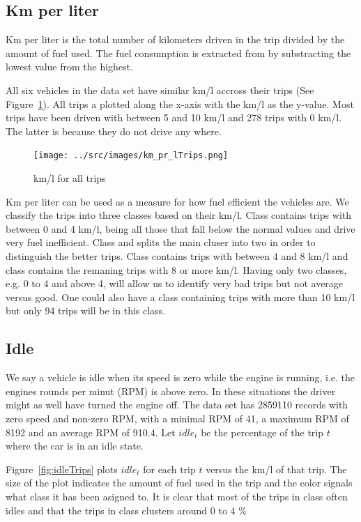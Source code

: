 \subsection{Km per liter}
Km per liter is the total number of kilometers driven in the trip divided by the amount of fuel used.
The fuel consumption is extracted from  by substracting the lowest value from the highest.

All six vehicles in the data set have similar km/l accross their trips (See Figure~\ref{fig:kmlTrips}).
All trips a plotted along the x-axis with the km/l as the y-value.
Most trips have been driven with between 5 and 10 km/l and 278 trips with 0 km/l. %
The latter is because they do not drive any where.
\begin{figure}[htb]
\centering
\texttt{[image: ../src/images/km\_pr\_lTrips.png]}
\caption{km/l for all trips}
\label{fig:kmlTrips}
\end{figure}

Km per liter can be used as a measure for how fuel efficient the vehicles are.
We classify the trips into three classes based on their km/l.
Class \fuelLow contains trips with between 0 and 4 km/l, being all those that fall below the normal values and drive very fuel inefficient.
Class \fuelMedium and \fuelHigh splits the main cluser into two in order to distinguish the better trips.
Class \fuelMedium contains trips with between 4 and 8 km/l and class \fuelHigh contains the remaning trips with 8 or more km/l.
Having only two classes, e.g. 0 to 4 and above 4, will allow us to identify very bad trips but not average versus good. 
One could also have a class containing trips with more than 10 km/l but only 94 trips will be in this class. %

\subsection{Idle}
We say a vehicle is idle when its speed is zero while the engine is running, i.e. the engines rounds per minut (RPM) is above zero. 
In these situations the driver might as well have turned the engine off.
The data set has 2859110 records with zero speed and non-zero RPM, with a minimal RPM of 41, a maximum RPM of 8192 and an average RPM of 910.4. %
Let $idle_t$ be the percentage of the trip $t$ where the car is in an idle state.

Figure~\ref{fig:idleTrips} plots $idle_t$ for each trip $t$ versus the km/l of that trip.
The size of the plot indicates the amount of fuel used in the trip and the color signals what class it has been asigned to. 
It is clear that most of the trips in class \fuelLow often idles and that the trips in class \fuelHigh clusters around 0 to 4 \%


